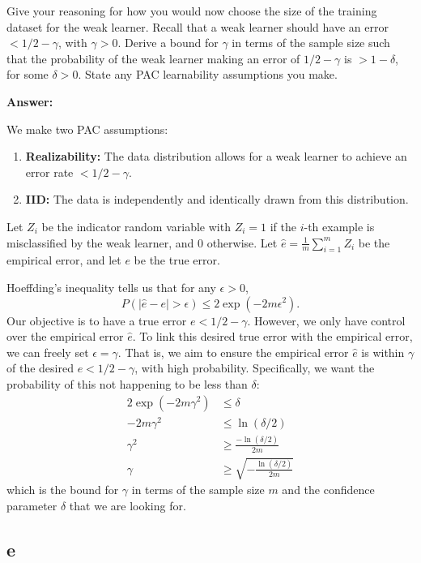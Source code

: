 \documentclass{article}
\begin{document}
Give your reasoning for how you would now choose the size of the training dataset for the weak learner.
Recall that a weak learner should have an error $< 1/2 - \gamma$, with $\gamma > 0$.
Derive a bound for $\gamma$ in terms of the sample size such that the probability of the weak learner making an error of $1/2 - \gamma$ is $> 1 - \delta$, for some $\delta > 0$.
State any PAC learnability assumptions you make.

\textbf{Answer:}

We make two PAC assumptions:
\begin{enumerate}
    \item \textbf{Realizability:} The data distribution allows for a weak learner to achieve an error rate \(< 1/2 - \gamma\).
    \item \textbf{IID:} The data is independently and identically drawn from this distribution.
\end{enumerate}
Let \(Z_i\) be the indicator random variable with \(Z_i = 1\) if the \(i\)-th example is misclassified by the weak learner, and \(0\) otherwise.
Let $\hat{e} = \frac{1}{m} \sum\limits_{i=1}^{m} Z_i$ be the empirical error, and let \(e\) be the true error.

Hoeffding's inequality tells us that for any \(\epsilon > 0\),
$$P(|\hat{e} - e| > \epsilon) \leq 2 \exp\left(-2m{\epsilon}^2\right).$$
Our objective is to have a true error \(e < 1/2 - \gamma\). However, we only have control over the empirical error \(\hat{e}\). To link this desired true error with the empirical error, we can freely set \(\epsilon = \gamma\).
That is, we aim to ensure the empirical error \(\hat{e}\) is within \(\gamma\) of the desired \(e < 1/2 - \gamma\), with high probability. Specifically, we want the probability of this not happening to be less than \(\delta\):
\begin{align*}
    2 \exp\left(-2m{\gamma}^2\right) &\leq \delta\\
    -2m{\gamma}^2 &\leq \ln\left(\delta/2\right)\\
    \gamma^2 &\geq \frac{-\ln\left(\delta/2\right)}{2m}\\
    \gamma &\geq \sqrt{-\frac{\ln(\delta/2)}{2m}}
\end{align*}
which is the bound for \(\gamma\) in terms of the sample size \(m\) and the confidence parameter \(\delta\) that we are looking for.

\subsection{e}
\end{document}
